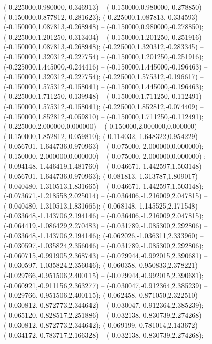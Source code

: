  (-0.225000,0.980000,-0.346913) -- (-0.150000,0.980000,-0.278850) -- (-0.150000,0.877812,-0.281623);
 (-0.225000,1.087813,-0.334593) -- (-0.150000,1.087813,-0.268948) -- (-0.150000,0.980000,-0.278850);
 (-0.225000,1.201250,-0.313404) -- (-0.150000,1.201250,-0.251916) -- (-0.150000,1.087813,-0.268948);
 (-0.225000,1.320312,-0.283345) -- (-0.150000,1.320312,-0.227754) -- (-0.150000,1.201250,-0.251916);
 (-0.225000,1.445000,-0.244416) -- (-0.150000,1.445000,-0.196463) -- (-0.150000,1.320312,-0.227754);
 (-0.225000,1.575312,-0.196617) -- (-0.150000,1.575312,-0.158041) -- (-0.150000,1.445000,-0.196463);
 (-0.225000,1.711250,-0.139948) -- (-0.150000,1.711250,-0.112491) -- (-0.150000,1.575312,-0.158041);
 (-0.225000,1.852812,-0.074409) -- (-0.150000,1.852812,-0.059810) -- (-0.150000,1.711250,-0.112491);
 (-0.225000,2.000000,0.000000) -- (-0.150000,2.000000,0.000000) -- (-0.150000,1.852812,-0.059810);
 (-0.114032,-1.648322,0.954229) -- (-0.056701,-1.644736,0.970963) -- (-0.075000,-2.000000,0.000000);
 (-0.150000,-2.000000,0.000000) -- (-0.075000,-2.000000,0.000000) ;
 (-0.094148,-1.446419,1.481760) -- (-0.046671,-1.442597,1.503148) -- (-0.056701,-1.644736,0.970963);
 (-0.081813,-1.313787,1.809017) -- (-0.040480,-1.310513,1.831665) -- (-0.046671,-1.442597,1.503148);
 (-0.073671,-1.218558,2.025014) -- (-0.036406,-1.216009,2.047815) -- (-0.040480,-1.310513,1.831665);
 (-0.068148,-1.145525,2.171548) -- (-0.033648,-1.143706,2.194146) -- (-0.036406,-1.216009,2.047815);
 (-0.064419,-1.086429,2.270483) -- (-0.031789,-1.085300,2.292806) -- (-0.033648,-1.143706,2.194146);
 (-0.062026,-1.036311,2.333960) -- (-0.030597,-1.035824,2.356046) -- (-0.031789,-1.085300,2.292806);
 (-0.060715,-0.991905,2.368743) -- (-0.029944,-0.992015,2.390681) -- (-0.030597,-1.035824,2.356046);
 (-0.060358,-0.950833,2.378221) -- (-0.029766,-0.951506,2.400115) -- (-0.029944,-0.992015,2.390681);
 (-0.060921,-0.911156,2.363277) -- (-0.030047,-0.912364,2.385239) -- (-0.029766,-0.951506,2.400115);
 (-0.062458,-0.871050,2.322510) -- (-0.030812,-0.872773,2.344642) -- (-0.030047,-0.912364,2.385239);
 (-0.065120,-0.828517,2.251886) -- (-0.032138,-0.830739,2.274268) -- (-0.030812,-0.872773,2.344642);
 (-0.069199,-0.781014,2.143672) -- (-0.034172,-0.783717,2.166328) -- (-0.032138,-0.830739,2.274268);
